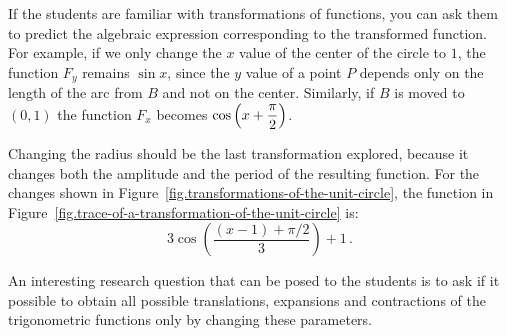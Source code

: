 If the students are familiar with transformations of functions, you can ask them to predict the algebraic expression corresponding to the transformed function.
For example, if we only change the $x$ value of the center of the circle to $1$,  the function $F_y$ remains $\sin x$, since the $y$ value of a point $P$ depends only on the length of the arc from $B$ and not on the center.
Similarly, if $B$ is moved to $(0,1)$ the function $F_x$ becomes $\cos\left(x + \displaystyle\frac{\pi}{2}\right)$.

Changing the radius should be the last transformation explored, because it changes both the amplitude and the period of the resulting function.
For the changes shown in Figure~\ref{fig.transformations-of-the-unit-circle}, the function in Figure~\ref{fig.trace-of-a-transformation-of-the-unit-circle} is:
\[
3\cos\left(\frac{(x-1)+\pi/2}{3}\right)+1\,.
\]

An interesting research question that can be posed to the students is to ask if it possible to obtain all possible translations, expansions and contractions of the trigonometric functions only by changing these parameters.


